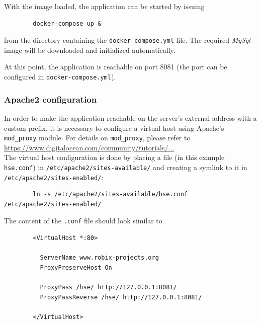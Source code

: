 \documentclass[a4paper]{usiinfbachelorproject}
\begin{document}
\begin{appendices}
        With the image loaded, the application can be started by issuing

        \begin{verbatim}
        docker-compose up &
        \end{verbatim}

        from the directory containing the \texttt{docker-compose.yml} file. The required \emph{MySql} image will
        be downloaded and initialized automatically.

        At this point, the application is reachable on port 8081 (the port can be configured in \texttt{docker-compose.yml}).

        \subsubsection{Apache2 configuration}

        In order to make the application reachable on the server's external address with a custom prefix, it is necessary to
        configure a virtual host using Apache's \texttt{mod\_proxy} module. For details on \texttt{mod\_proxy}, please
        refer to \\ \href{https://www.digitalocean.com/community/tutorials/how-to-use-apache-http-server-as-reverse-proxy-using-mod_proxy-extension}{https://www.digitalocean.com/community/tutorials/...} \\

        The virtual host configuration is done by placing a file (in this example \texttt{hse.conf}) in \texttt{/etc/apache2/sites-available/} and creating
        a symlink to it in \texttt{/etc/apache2/sites-enabled/}:

        \begin{verbatim}
        ln -s /etc/apache2/sites-available/hse.conf /etc/apache2/sites-enabled/
        \end{verbatim}

        The content of the \texttt{.conf} file should look similar to

        \begin{verbatim}
        <VirtualHost *:80>

          ServerName www.robix-projects.org
          ProxyPreserveHost On

          ProxyPass /hse/ http://127.0.0.1:8081/
          ProxyPassReverse /hse/ http://127.0.0.1:8081/

        </VirtualHost>
        \end{verbatim}


\end{appendices}
\end{document}
